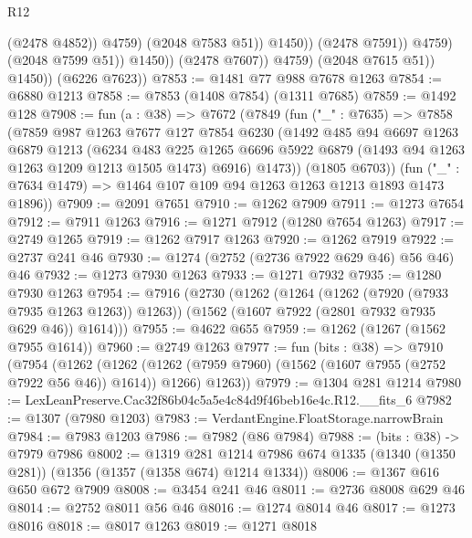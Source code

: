 \begin{lexlean}{R12}
\begin{coremodule}
                                    (@2478 @4852))
                                  @4759)
                                (@2048 @7583 @51))
                              @1450))
                          (@2478 @7591))
                        @4759)
                      (@2048 @7599 @51))
                    @1450))
                (@2478 @7607))
              @4759)
            (@2048 @7615 @51))
          @1450))
      (@6226 @7623))
@7853 := @1481 @77 @988 @7678 @1263
@7854 := @6880 @1213
@7858 := @7853 (@1408 @7854) (@1311 @7685)
@7859 := @1492 @128
@7908 := fun (a : @38) =>
  @7672
    (@7849
      (fun ("_" : @7635) =>
      @7858
        (@7859
          @987
          @1263
          @7677
          @127
          @7854
          @6230
          (@1492
            @485
            @94
            @6697
            @1263
            @6879
            @1213
            (@6234
              @483
              @225
              @1265
              @6696
              @5922
              @6879
              (@1493 @94 @1263 @1263 @1209 @1213 @1505 @1473)
              @6916)
            @1473))
        (@1805 @6703))
      (fun ("_" : @7634 @1479) => @1464 @107 @109 @94 @1263 @1263 @1213 @1893 @1473 @1896))
@7909 := @2091 @7651
@7910 := @1262 @7909
@7911 := @1273 @7654
@7912 := @7911 @1263
@7916 := @1271 @7912 (@1280 @7654 @1263)
@7917 := @2749 @1265
@7919 := @1262 @7917 @1263
@7920 := @1262 @7919
@7922 := @2737 @241 @46
@7930 := @1274 (@2752 (@2736 @7922 @629 @46) @56 @46) @46
@7932 := @1273 @7930 @1263
@7933 := @1271 @7932
@7935 := @1280 @7930 @1263
@7954 := @7916
    (@2730
      (@1262
        (@1264 (@1262 (@7920 (@7933 @7935 @1263 @1263)) @1263))
        (@1562 (@1607 @7922 (@2801 @7932 @7935 @629 @46)) @1614)))
@7955 := @4622 @655
@7959 := @1262 (@1267 (@1562 @7955 @1614))
@7960 := @2749 @1263
@7977 := fun (bits : @38) =>
  @7910
    (@7954
      (@1262
        (@1262 (@1262 (@7959 @7960) (@1562 (@1607 @7955 (@2752 @7922 @56 @46)) @1614)) @1266)
        @1263))
@7979 := @1304 @281 @1214
@7980 := LexLeanPreserve.Cac32f86b04c5a5e4c84d9f46beb16e4c.R12.__fits_6
@7982 := @1307 (@7980 @1203)
@7983 := VerdantEngine.FloatStorage.narrowBrain
@7984 := @7983 @1203
@7986 := @7982 (@86 @7984)
@7988 := (bits : @38) -> @7979 @7986
@8002 := @1319
    @281
    @1214
    @7986
    @674
    @1335
    (@1340 (@1350 @281))
    (@1356 (@1357 (@1358 @674) @1214 @1334))
@8006 := @1367 @616 @650 @672 @7909
@8008 := @3454 @241 @46
@8011 := @2736 @8008 @629 @46
@8014 := @2752 @8011 @56 @46
@8016 := @1274 @8014 @46
@8017 := @1273 @8016
@8018 := @8017 @1263
@8019 := @1271 @8018

\end{coremodule}
\end{lexlean}
